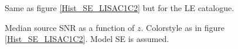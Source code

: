 \documentclass{iopart}
\begin{document}
\begin{figure}
\caption{Same as figure \ref{Hist_SE_LISAC1C2} but for the LE catalogue.
\label{Hist_LE_LISAC1C2} } 
\end{figure}




\begin{figure}
\caption{Median source SNR as a function of $z$. Colorstyle as in figure
\ref{Hist_SE_LISAC1C2}. Model SE is assumed.
\label{MedianSNR_SE_LISAC1C2} } 
\end{figure}
\end{document}
